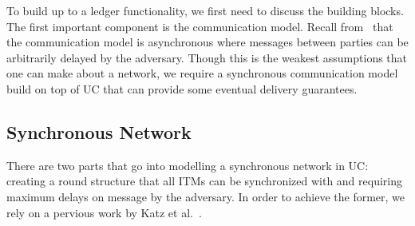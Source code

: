 To build up to a ledger functionality, we first need to discuss the building blocks.
The first important component is the communication model.
Recall from~\cite{uc} that the communication model is asynchronous where messages between parties can be arbitrarily delayed by the adversary.
Though this is the weakest assumptions that one can make about a network, we require a synchronous communication model build on top of UC that can provide some eventual delivery guarantees.

\subsection{Synchronous Network}
There are two parts that go into modelling a synchronous network in UC: creating a round structure that all ITMs can be synchronized with and requiring maximum delays on message by the adversary.
In order to achieve the former, we rely on a pervious work by Katz et al.~\cite{katz-clock}.

